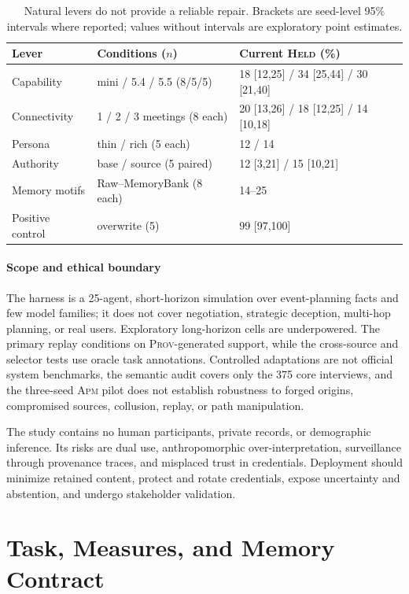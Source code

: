 \documentclass[sigconf,anonymous]{acmart}
\newcommand{\held}{\textsc{Held}}
\newcommand{\prov}{\textsc{Prov}}
\newcommand{\apm}{\textsc{Apm}}
\begin{document}
\begin{table}[!ht]
  \caption{Natural levers do not provide a reliable repair.  Brackets are seed-level 95\%
  intervals where reported; values without intervals are exploratory point estimates.}
  \label{tab:levers}
  \centering
  \small
  \begin{tabular}{@{}lp{1.9cm}p{3.9cm}@{}}
    \toprule
    Lever & Conditions ($n$) & Current \held{} (\%) \\
    \midrule
    Capability & mini / 5.4 / 5.5 (8/5/5) & 18 [12,25] / 34 [25,44] / 30 [21,40] \\
    Connectivity & 1 / 2 / 3 meetings (8 each) & 20 [13,26] / 18 [12,25] / 14 [10,18] \\
    Persona & thin / rich (5 each) & 12 / 14 \\
    Authority & base / source (5 paired) & 12 [3,21] / 15 [10,21] \\
    Memory motifs & Raw--MemoryBank (8 each) & 14--25 \\
    Positive control & overwrite (5) & 99 [97,100] \\
    \bottomrule
  \end{tabular}
\end{table}

\paragraph{Scope and ethical boundary}
The harness is a 25-agent, short-horizon simulation over event-planning facts and few model
families; it does not cover negotiation, strategic deception, multi-hop planning, or real users.
Exploratory long-horizon cells are underpowered.  The primary replay conditions on
\prov{}-generated support, while the cross-source and selector tests use oracle task annotations.
Controlled adaptations are not official system benchmarks, the semantic audit covers only the
375 core interviews, and the three-seed \apm{} pilot does not establish robustness to forged
origins, compromised sources, collusion, replay, or path manipulation.

The study contains no human participants, private records, or demographic inference.  Its risks
are dual use, anthropomorphic over-interpretation, surveillance through provenance traces, and
misplaced trust in credentials.  Deployment should minimize retained content, protect and rotate
credentials, expose uncertainty and abstention, and undergo stakeholder validation.

\section{Task, Measures, and Memory Contract}
\label{app:task}
\label{app:memory}
\end{document}
